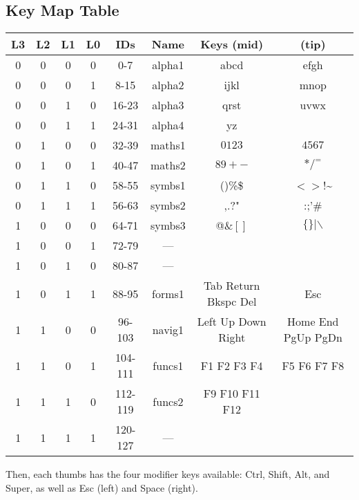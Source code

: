 \documentclass{article}
\begin{document}
\subsection{Key Map Table}
\begin{center}
\begin{tabular}{|c|c|c|c|c|c|cc|}
  \hline
  L3 & L2 & L1 & L0 & IDs     & Name   & Keys (mid) & (tip) \\ \hline
  0  & 0  & 0  & 0  & 0-7     & alpha1 & abcd       & efgh \\ \hline
  0  & 0  & 0  & 1  & 8-15    & alpha2 & ijkl       & mnop \\ \hline
  0  & 0  & 1  & 0  & 16-23   & alpha3 & qrst       & uvwx \\ \hline
  0  & 0  & 1  & 1  & 24-31   & alpha4 & yz         &      \\ \hline
  0  & 1  & 0  & 0  & 32-39   & maths1 & $0123$     & $4567$ \\ \hline
  0  & 1  & 0  & 1  & 40-47   & maths2 & $89+-$     & $*/^=$ \\ \hline
  0  & 1  & 1  & 0  & 58-55   & symbs1 &()\%\$      & $<>$!\textasciitilde \\ \hline
  0  & 1  & 1  & 1  & 56-63   & symbs2 & ,.?"       & :;'\#\\ \hline
  1  & 0  & 0  & 0  & 64-71   & symbs3 & @\&$[]$    & $\{\}|\backslash$ \\ \hline
  1  & 0  & 0  & 1  & 72-79   &  ---   && \\ \hline
  1  & 0  & 1  & 0  & 80-87   &  ---   && \\ \hline
  1  & 0  & 1  & 1  & 88-95   & forms1 & Tab Return Bkspc Del & Esc \\ \hline
  1  & 1  & 0  & 0  & 96-103  & navig1 & Left Up Down Right & Home End PgUp PgDn \\ \hline
  1  & 1  & 0  & 1  & 104-111 & funcs1 & F1 F2 F3 F4 & F5 F6 F7 F8 \\ \hline
  1  & 1  & 1  & 0  & 112-119 & funcs2 & F9 F10 F11 F12 & \\ \hline
  1  & 1  & 1  & 1  & 120-127 &  ---   && \\ \hline
\end{tabular}
\end{center}

Then, each thumbs has the four modifier keys available: Ctrl, Shift, Alt, and Super, as well as Esc (left) and Space (right).
\end{document}
